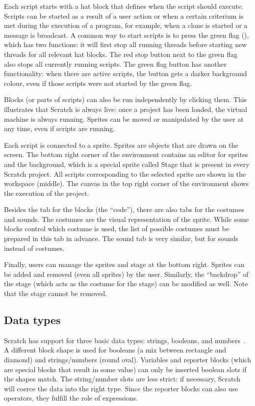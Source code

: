 \documentclass[../main]{subfiles}
\begin{document}
Each script starts with a hat block that defines when the script should execute.
Scripts can be started as a result of a user action or when a certain criterium is met during the execution of a program, for example, when a clone is started or a message is broadcast.
A common way to start scripts is to press the green flag (\greenflag), which has two functions: it will first stop all running threads before starting new threads for all relevant hat blocks.
The red stop button next to the green flag also stops all currently running scripts.
The green flag button has another functionality: when there are active scripts, the button gets a darker background colour, even if those scripts were not started by the green flag.

Blocks (or parts of scripts) can also be run independently by clicking them.
This illustrates that Scratch is always live: once a project has been loaded, the virtual machine is always running.
Sprites can be moved or manipulated by the user at any time, even if scripts are running.

Each script is connected to a sprite.
Sprites are objects that are drawn on the screen.
The bottom right corner of the environment contains an editor for sprites and the background, which is a special sprite called Stage that is present in every Scratch project.
All scripts corresponding to the selected sprite are shown in the workspace (middle).
The canvas in the top right corner of the environment shows the execution of the project.

Besides the tab for the blocks (the ``code''), there are also tabs for the costumes and sounds.
The costumes are the visual representation of the sprite.
While some blocks control which costume is used, the list of possible costumes must be prepared in this tab in advance.
The sound tab is very similar, but for sounds instead of costumes.

Finally, users can manage the sprites and stage at the bottom right.
Sprites can be added and removed (even all sprites) by the user.
Similarly, the ``backdrop'' of the stage (which acts as the costume for the stage) can be modified as well.
Note that the stage cannot be removed.

\subsection{Data types}\label{subsec:scratch-data-types}

Scratch has support for three basic data types: strings, booleans, and numbers~\autocite{maloneyScratchProgrammingLanguage2010a}.
A different block shape is used for booleans (a mix between rectangle and diamond) and strings/numbers (round oval).
Variables and reporter blocks (which are special blocks that result in some value) can only be inserted boolean slots if the shapes match.
The string/number slots are less strict: if necessary, Scratch will coerce the data into the right type.
Since the reporter blocks can also use operators, they fulfill the role of expressions.
\end{document}
